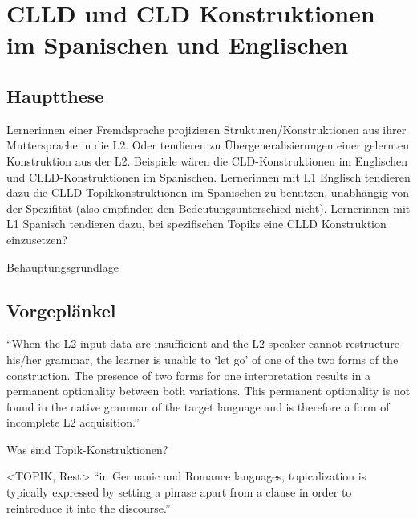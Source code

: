 \section{CLLD und CLD Konstruktionen im Spanischen und Englischen}

\subsection{Hauptthese}

Lernerinnen einer Fremdsprache projizieren Strukturen/Konstruktionen aus ihrer Muttersprache in die L2.
Oder tendieren zu Übergeneralisierungen einer gelernten Konstruktion aus der L2.
Beispiele wären die CLD-Konstruktionen im Englischen und CLLD-Konstruktionen im Spanischen.
Lernerinnen mit L1 Englisch tendieren dazu die CLLD Topikkonstruktionen im Spanischen zu benutzen, unabhängig von der Spezifität (also empfinden den Bedeutungsunterschied nicht).
Lernerinnen mit L1 Spanisch tendieren dazu, bei spezifischen Topiks eine CLLD Konstruktion einzusetzen?
\cite{Valenzuela05}


Behauptungsgrundlage


\subsection{Vorgeplänkel}

\cite{Valenzuela05}
``When the L2 input data are insufficient and the L2 speaker cannot restructure his/her grammar, the learner is unable to `let go' of
one of the two forms of the construction.
The presence of two forms for one interpretation results in a permanent optionality between both variations.
This permanent optionality is not found in the native grammar of the target language and is therefore a form of incomplete L2 acquisition.''

Was sind Topik-Konstruktionen?

<TOPIK, Rest>
``in Germanic and Romance languages, topicalization is typically expressed by setting a phrase apart
from a clause in order to reintroduce it into the discourse.''

